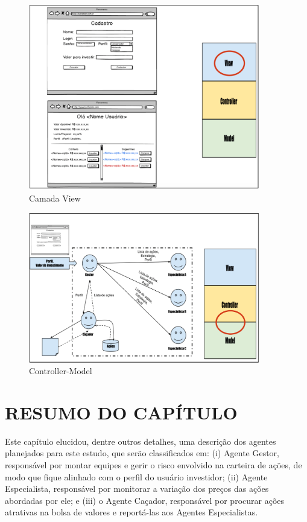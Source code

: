 \begin{figure}[h]
\centering
\label{f24}
\includegraphics[width=0.9\textwidth]{figuras/f24}
\caption{Camada View}
\end{figure}

\begin{figure}[h]
\centering
\label{f25}
\includegraphics[width=0.9\textwidth]{figuras/f25}
\caption{Controller-Model}
\end{figure}


\section{RESUMO DO CAPÍTULO}

Este capítulo elucidou, dentre outros detalhes, uma descrição dos agentes planejados para este estudo, que serão classificados em: (i) Agente Gestor, responsável por montar equipes e gerir o risco envolvido na carteira de ações, de modo que fique alinhado com o perfil do usuário investidor; (ii) Agente Especialista, responsável por monitorar a variação dos preços das ações abordadas por ele; e (iii) o Agente Caçador, responsável por procurar ações atrativas na bolsa de valores e reportá-las aos Agentes Especialistas.

